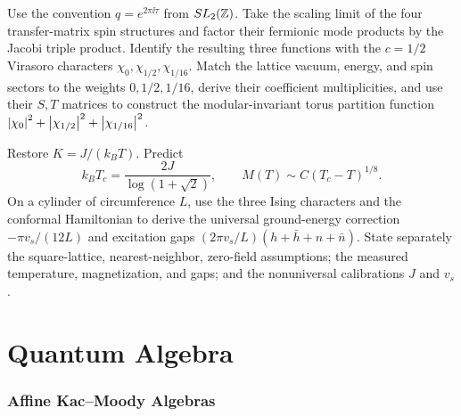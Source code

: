 \begin{exercise}
Use the convention $q=e^{2\pi\ii\tau}$ from $SL_2(\mathbb Z)$.  Take the scaling
limit of the four transfer-matrix spin structures and factor their fermionic
mode products by the Jacobi triple product.  Identify the resulting three
functions with the $c=1/2$ Virasoro characters
$\chi_0,\chi_{1/2},\chi_{1/16}$.  Match the lattice
vacuum, energy, and spin sectors to the weights $0,1/2,1/16$, derive their
coefficient multiplicities, and use their $S,T$ matrices to construct the
modular-invariant torus partition function
$\left\lvert \chi_0\right\rvert^2+\left\lvert \chi_{1/2}\right\rvert^2+\left\lvert \chi_{1/16}\right\rvert^2$.
\end{exercise}

\begin{exercise}
Restore $K=J/(k_BT)$.  Predict
\[
 k_BT_c=\frac{2J}{\log(1+\sqrt2)},\qquad
 M(T)\sim C(T_c-T)^{1/8}.
\]
On a cylinder of circumference $L$, use the three Ising characters and the
conformal Hamiltonian to derive the universal ground-energy correction
$-\pi v_s/(12L)$ and excitation gaps
$(2\pi v_s/L)(h+\bar h+n+\bar n)$.  State separately the square-lattice,
nearest-neighbor, zero-field assumptions; the measured temperature,
magnetization, and gaps; and the nonuniversal calibrations $J$ and $v_s$.
\end{exercise}

\part{Quantum Algebra}

\section{Affine Kac--Moody Algebras}


